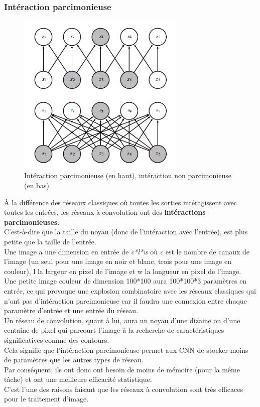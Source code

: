 \documentclass[11pt]{article}
\begin{document}
\subsubsection{Intéraction parcimonieuse}
\label{sec:org310c5e7}
\begin{figure}[htbp]
\centering
\includegraphics[width=8cm]{sparse_vs_dense.png}
\caption{Intéraction parcimonieuse (en haut), intéraction non parcimonieuse (en bas) \label{sparse-vs-dense}}
\end{figure}

À la différence des réseaux classiques où toutes les sorties intéragissent avec toutes les entrées, les réseaux à convolution ont des \textbf{intéractions parcimonieuses}.\\
C'est-à-dire que la taille du noyau (donc de l'intéraction avec l'entrée), est plus petite que la taille de l'entrée.\\
Une image a une dimension en entrée de \emph{c*l*w} où \emph{c} est le nombre de canaux de l'image (un seul pour une image en noir et blanc, trois pour une image en couleur), l la largeur en pixel de l'image et w la longueur en pixel de l'image.\\
Une petite image couleur de dimension 100*100 aura 100*100*3 paramètres en entrée, ce qui provoque une explosion combinatoire avec les réseaux classiques qui n'ont pas d'intéraction parcimonieuse car il faudra une connexion entre chaque paramètre d'entrée et une entrée du réseau.\\
Un réseau de convolution, quant à lui, aura un noyau d'une dizaine ou d'une centaine de pixel qui parcourt l'image à la recherche de caractéristiques significatives comme des contours.\\
Cela signifie que l'intéraction parcimonieuse permet aux CNN de stocker moins de paramètres que les autres types de réseau.\\
Par conséquent, ils ont donc ont besoin de moins de mémoire (pour la même tâche) et ont une meilleure efficacité statistique.\\
C'est l'une des raisons faisant que les réseaux à convolution sont très efficaces pour le traitement d'image.\\
\end{document}
